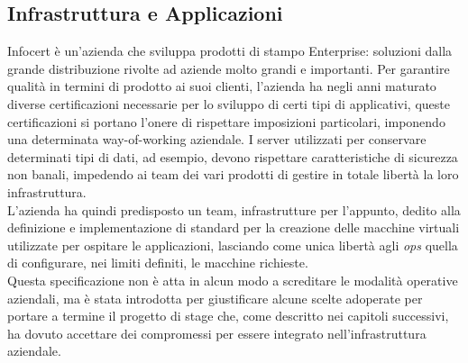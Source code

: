 \subsection{Infrastruttura e Applicazioni}
Infocert è un'azienda che sviluppa prodotti di stampo Enterprise: soluzioni dalla grande distribuzione rivolte ad aziende molto grandi e importanti. Per garantire qualità in termini di prodotto ai suoi clienti, l'azienda ha negli anni maturato diverse certificazioni necessarie per lo sviluppo di certi tipi di applicativi, queste certificazioni si portano l'onere di rispettare imposizioni particolari, imponendo una determinata \gls{way-of-working} aziendale.
I server utilizzati per conservare determinati tipi di dati, ad esempio, devono rispettare caratteristiche di sicurezza non banali, impedendo ai team dei vari prodotti di gestire in totale libertà la loro infrastruttura. \\
L'azienda ha quindi predisposto un team, infrastrutture per l'appunto, dedito alla definizione e implementazione di standard per la creazione delle macchine virtuali utilizzate per ospitare le applicazioni, lasciando come unica libertà agli \textit{ops} quella di configurare, nei limiti definiti, le macchine richieste. \\
Questa specificazione non è atta in alcun modo a screditare le modalità operative aziendali, ma è stata introdotta per giustificare alcune scelte adoperate per portare a termine il progetto di stage che, come descritto nei capitoli successivi, ha dovuto accettare dei compromessi per essere integrato nell'infrastruttura aziendale.
